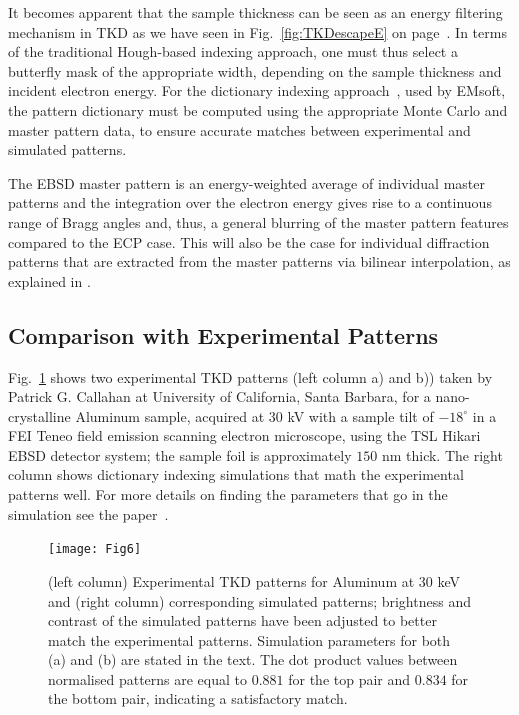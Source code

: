 It becomes apparent that the sample thickness can be seen as an energy filtering mechanism in TKD as we have seen in Fig.~\ref{fig:TKDescapeE} on page~\pageref{fig:TKDescapeE}. In terms of the traditional Hough-based indexing approach, one must thus select a butterfly mask of the appropriate width, depending on the sample thickness and incident electron energy. For the dictionary indexing approach~\cite{Marquardt17}, used by EMsoft, the pattern dictionary must be computed using the appropriate Monte Carlo and master pattern data, to ensure accurate matches between experimental and simulated patterns.



The EBSD master pattern is an energy-weighted average of individual master patterns and the integration over the electron energy gives rise to a continuous range of Bragg angles and, thus, a general blurring of the master pattern features compared to the ECP case. This will also be the case for individual diffraction patterns that are extracted from the master patterns via bilinear interpolation, as explained in \cite{degraef2013e}.

\subsection{Comparison with Experimental Patterns\label{sec:compexp}}

Fig.~\ref{fig:TKDpatternfit} shows two experimental TKD patterns (left column a) and b)) taken by  Patrick G. Callahan at University of California, Santa Barbara, for a nano-crystalline Aluminum sample, acquired at $30$ kV with a sample tilt of $-18^{\circ}$ in a FEI Teneo field emission scanning electron microscope, using the TSL Hikari EBSD detector system; the sample foil is approximately $150$ nm thick.  The right column shows dictionary indexing simulations that math the experimental patterns well. For more details on finding the parameters that go in the simulation see the paper~\cite{PascalTKD}.


\begin{figure}[ht]
\centering
\texttt{[image: Fig6]}
\caption[Experimental TKD patterns for Aluminum at $30$ keV and corresponding simulated patterns]{(left column) Experimental TKD patterns for Aluminum at $30$ keV and (right column) corresponding simulated patterns; brightness and contrast of the simulated patterns have been adjusted to better match the experimental patterns.  Simulation parameters for both (a) and (b) are stated in the text. The dot product values between normalised patterns are equal to $0.881$ for the top pair and $0.834$ for the bottom pair, indicating a satisfactory match.}
\label{fig:TKDpatternfit}
\end{figure}

